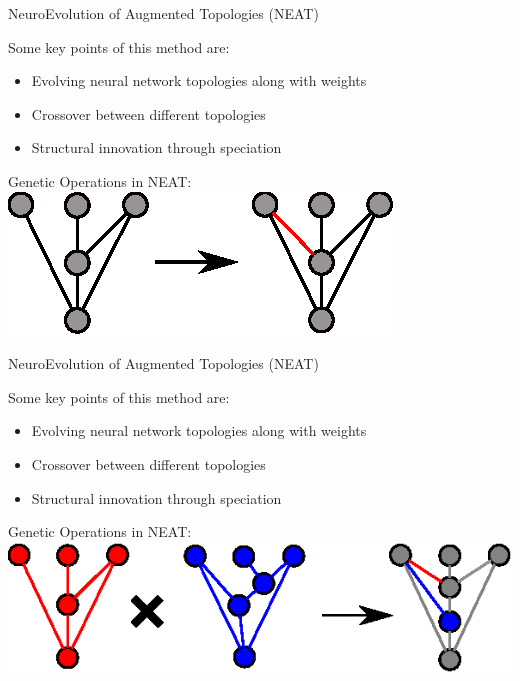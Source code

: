 \documentclass[6pt]{beamer}
\begin{document}
\begin{frame}{NeuroEvolution of Augmented Topologies (NEAT)}
\begin{block}{Some key points of this method are:}
\begin{itemize}
\item Evolving neural network topologies along with weights
\item Crossover between different topologies
\item Structural innovation through speciation
\end{itemize}
\end{block}
\begin{block}{Genetic Operations in NEAT:}
\centering
\includegraphics[height=0.25\textheight]{../Figures/Misc/neatAddLink.eps}
\end{block}
\end{frame}

\begin{frame}{NeuroEvolution of Augmented Topologies (NEAT)}
\begin{block}{Some key points of this method are:}
\begin{itemize}
\item Evolving neural network topologies along with weights
\item Crossover between different topologies
\item Structural innovation through speciation
\end{itemize}
\end{block}
\begin{block}{Genetic Operations in NEAT:}
\centering
\includegraphics[height=0.25\textheight]{../Figures/Misc/neatCrossOver.eps}
\end{block}
\end{frame}
\end{document}
